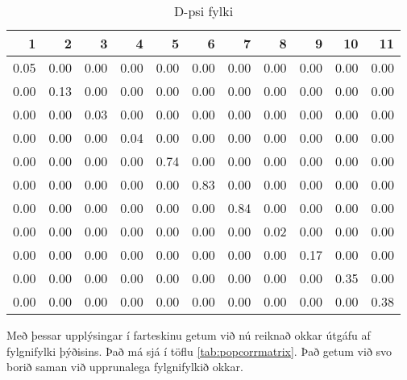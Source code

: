 \documentclass[]{book}
\begin{document}
\begin{table}

\caption{\label{tab:dpsifylki}D-psi fylki}
\centering
\begin{tabular}[t]{r|r|r|r|r|r|r|r|r|r|r}
\hline
1 & 2 & 3 & 4 & 5 & 6 & 7 & 8 & 9 & 10 & 11\\
\hline
0.05 & 0.00 & 0.00 & 0.00 & 0.00 & 0.00 & 0.00 & 0.00 & 0.00 & 0.00 & 0.00\\
\hline
0.00 & 0.13 & 0.00 & 0.00 & 0.00 & 0.00 & 0.00 & 0.00 & 0.00 & 0.00 & 0.00\\
\hline
0.00 & 0.00 & 0.03 & 0.00 & 0.00 & 0.00 & 0.00 & 0.00 & 0.00 & 0.00 & 0.00\\
\hline
0.00 & 0.00 & 0.00 & 0.04 & 0.00 & 0.00 & 0.00 & 0.00 & 0.00 & 0.00 & 0.00\\
\hline
0.00 & 0.00 & 0.00 & 0.00 & 0.74 & 0.00 & 0.00 & 0.00 & 0.00 & 0.00 & 0.00\\
\hline
0.00 & 0.00 & 0.00 & 0.00 & 0.00 & 0.83 & 0.00 & 0.00 & 0.00 & 0.00 & 0.00\\
\hline
0.00 & 0.00 & 0.00 & 0.00 & 0.00 & 0.00 & 0.84 & 0.00 & 0.00 & 0.00 & 0.00\\
\hline
0.00 & 0.00 & 0.00 & 0.00 & 0.00 & 0.00 & 0.00 & 0.02 & 0.00 & 0.00 & 0.00\\
\hline
0.00 & 0.00 & 0.00 & 0.00 & 0.00 & 0.00 & 0.00 & 0.00 & 0.17 & 0.00 & 0.00\\
\hline
0.00 & 0.00 & 0.00 & 0.00 & 0.00 & 0.00 & 0.00 & 0.00 & 0.00 & 0.35 & 0.00\\
\hline
0.00 & 0.00 & 0.00 & 0.00 & 0.00 & 0.00 & 0.00 & 0.00 & 0.00 & 0.00 & 0.38\\
\hline
\end{tabular}
\end{table}

Með þessar upplýsingar í farteskinu getum við nú reiknað okkar útgáfu af fylgnifylki þýðisins. Það má sjá í töflu \ref{tab:popcorrmatrix}. Það getum við svo borið saman við upprunalega fylgnifylkið okkar.
\end{document}
